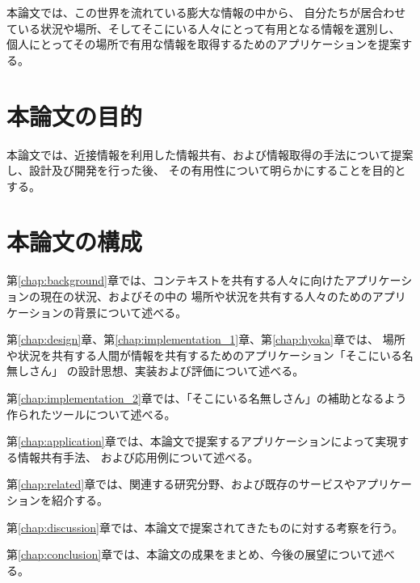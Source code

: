 本論文では、この世界を流れている膨大な情報の中から、
自分たちが居合わせている状況や場所、そしてそこにいる人々にとって有用となる情報を選別し、
個人にとってその場所で有用な情報を取得するためのアプリケーションを提案する。


\newpage


\section{本論文の目的}

本論文では、近接情報を利用した情報共有、および情報取得の手法について提案し、設計及び開発を行った後、
その有用性について明らかにすることを目的とする。


\section{本論文の構成}

第\ref{chap:background}章では、コンテキストを共有する人々に向けたアプリケーションの現在の状況、およびその中の
場所や状況を共有する人々のためのアプリケーションの背景について述べる。

第\ref{chap:design}章、第\ref{chap:implementation_1}章、第\ref{chap:hyoka}章では、
場所や状況を共有する人間が情報を共有するためのアプリケーション「そこにいる名無しさん」
の設計思想、実装および評価について述べる。

第\ref{chap:implementation_2}章では、「そこにいる名無しさん」の補助となるよう作られたツールについて述べる。

第\ref{chap:application}章では、本論文で提案するアプリケーションによって実現する情報共有手法、
および応用例について述べる。

第\ref{chap:related}章では、関連する研究分野、および既存のサービスやアプリケーションを紹介する。

第\ref{chap:discussion}章では、本論文で提案されてきたものに対する考察を行う。

第\ref{chap:conclusion}章では、本論文の成果をまとめ、今後の展望について述べる。
